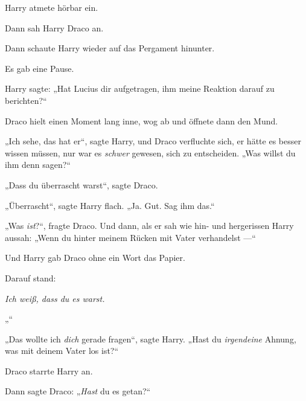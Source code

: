 Harry atmete hörbar ein.

Dann sah Harry Draco an.

Dann schaute Harry wieder auf das Pergament hinunter.

Es gab eine Pause.

Harry sagte:
„Hat Lucius dir aufgetragen, ihm meine Reaktion darauf zu berichten?“

Draco hielt einen Moment lang inne, wog ab und öffnete dann den Mund.

„Ich sehe, das hat er“, sagte Harry, und Draco verfluchte sich, er hätte es besser wissen müssen, nur war es \emph{schwer} gewesen, sich zu entscheiden.
„Was willst du ihm denn sagen?“

„Dass du überrascht warst“, sagte Draco.

„Überrascht“, sagte Harry flach.
„Ja. Gut. Sag ihm das.“

„Was \emph{ist}?“, fragte Draco. Und dann, als er sah wie hin- und hergerissen Harry aussah:
„Wenn du hinter meinem Rücken mit Vater verhandelst —“

Und Harry gab Draco ohne ein Wort das Papier.

Darauf stand:

\emph{Ich weiß, dass du es warst.}

„\emph{}“

„Das wollte ich \emph{dich} gerade fragen“, sagte Harry.
„Hast du \emph{irgendeine} Ahnung, was mit deinem Vater los ist?“

Draco starrte Harry an.

Dann sagte Draco: „\emph{Hast} du es getan?“

